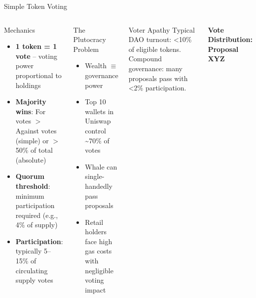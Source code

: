 \documentclass[8pt,aspectratio=169]{beamer}
\begin{document}
\begin{frame}{Simple Token Voting}
\begin{columns}[T]
\begin{block}{Mechanics}
\footnotesize
\begin{itemize}
  \item \textbf{1 token = 1 vote} -- voting power proportional to holdings
  \item \textbf{Majority wins}: For votes $>$ Against votes (simple) or $>$50\% of total (absolute)
  \item \textbf{Quorum threshold}: minimum participation required (e.g., 4\% of supply)
  \item \textbf{Participation}: typically 5--15\% of circulating supply votes
\end{itemize}
\end{block}
\vspace{2mm}
\begin{alertblock}{The Plutocracy Problem}
\footnotesize
\begin{itemize}
  \item Wealth \(\equiv\) governance power
  \item Top 10 wallets in Uniswap control \textasciitilde70\% of votes
  \item Whale can single-handedly pass proposals
  \item Retail holders face high gas costs with negligible voting impact
\end{itemize}
\end{alertblock}
\vspace{1mm}
\begin{exampleblock}{Voter Apathy}
\footnotesize
Typical DAO turnout: \textless10\% of eligible tokens. Compound governance: many proposals pass with \textless2\% participation.
\end{exampleblock}

\vspace{2mm}
\begin{center}
\textbf{\small Vote Distribution: Proposal XYZ}
\end{center}
\end{columns}
\end{frame}
\end{document}
